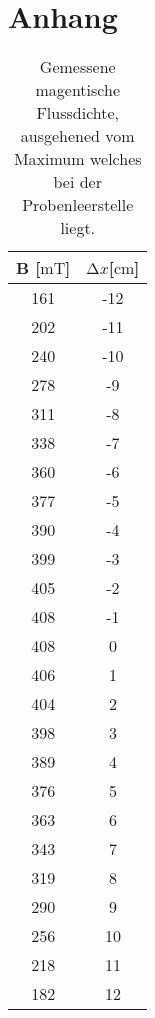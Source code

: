 \section{Anhang}

\begin{table}
    \centering
    \caption{Gemessene magentische Flussdichte, ausgehened vom Maximum welches bei der Probenleerstelle liegt.}
    \label{tab:diff}
    \begin{tabular}{c c}
    \toprule
     B [$\si{\milli\tesla}$] &  $\increment x $[$\si{\centi\meter}$] \\
     \midrule
     161&  -12   \\   
     202&  -11  \\
     240&  -10  \\
     278&  -9  \\
     311&  -8  \\
     338&  -7  \\
     360&  -6  \\
     377&  -5  \\
     390&  -4  \\
     399&  -3  \\
     405&  -2  \\
     408&  -1  \\
     408&  0  \\
     406&  1  \\
     404&  2  \\
     398&  3  \\
     389&  4   \\
     376&  5  \\
     363&  6  \\
     343&  7  \\
     319&  8  \\
     290&  9  \\
     256&  10  \\
     218&  11  \\
     182&  12  \\
    \end{tabular}
\end{table}


